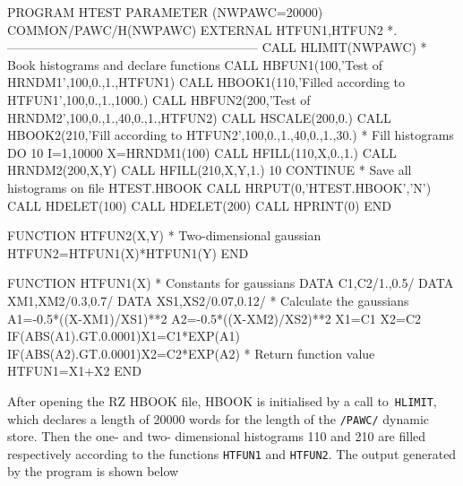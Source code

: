 \begin{minipage}[t]{.49\linewidth}
\begin{talltt}
      PROGRAM HTEST
      PARAMETER (NWPAWC=20000)
      COMMON/PAWC/H(NWPAWC)
      EXTERNAL HTFUN1,HTFUN2
*.------------------------------------------------------------
      CALL HLIMIT(NWPAWC)
*             Book histograms and declare functions
      CALL HBFUN1(100,'Test of HRNDM1',100,0.,1.,HTFUN1)
      CALL HBOOK1(110,'Filled according to HTFUN1',100,0.,1.,1000.)
      CALL HBFUN2(200,'Test of HRNDM2',100,0.,1.,40,0.,1.,HTFUN2)
      CALL HSCALE(200,0.)
      CALL HBOOK2(210,'Fill according to HTFUN2',100,0.,1.,40,0.,1.,30.)
*             Fill histograms
      DO 10 I=1,10000
         X=HRNDM1(100)
         CALL HFILL(110,X,0.,1.)
         CALL HRNDM2(200,X,Y)
         CALL HFILL(210,X,Y,1.)
  10  CONTINUE
*             Save all histograms on file HTEST.HBOOK
      CALL HRPUT(0,'HTEST.HBOOK','N')
      CALL HDELET(100)
      CALL HDELET(200)
      CALL HPRINT(0)
      END
\end{talltt}
\end{minipage}\hfill
\begin{minipage}[t]{.49\linewidth}
\begin{talltt}
      FUNCTION HTFUN2(X,Y)
*             Two-dimensional gaussian
      HTFUN2=HTFUN1(X)*HTFUN1(Y)
      END
 
      FUNCTION HTFUN1(X)
*             Constants for gaussians
      DATA C1,C2/1.,0.5/
      DATA XM1,XM2/0.3,0.7/
      DATA XS1,XS2/0.07,0.12/
*             Calculate the gaussians
      A1=-0.5*((X-XM1)/XS1)**2
      A2=-0.5*((X-XM2)/XS2)**2
      X1=C1
      X2=C2
      IF(ABS(A1).GT.0.0001)X1=C1*EXP(A1)
      IF(ABS(A2).GT.0.0001)X2=C2*EXP(A2)
*             Return function value
      HTFUN1=X1+X2
      END
\end{talltt}
\end{minipage}

After opening the RZ HBOOK file, HBOOK is initialised by a call to~\texttt{HLIMIT}, 
which declares a length of 20000 words for the
length of the \texttt{/PAWC/} dynamic store. Then the one- and two-
dimensional histograms 110 and 210 are filled respectively
according to the functions \texttt{HTFUN1} and \texttt{HTFUN2}.
The output generated by the program is shown below


